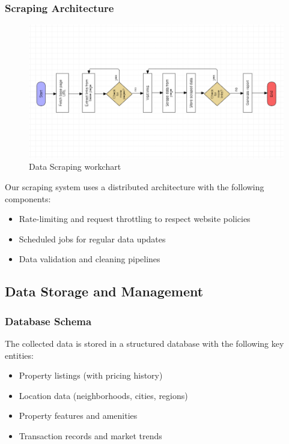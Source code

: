 \subsubsection{Scraping Architecture}
\begin{figure}[ht!]
    \centering
    \includegraphics[width=1\textwidth]{images/workchartscraper.png}
    \caption{Data Scraping workchart}
    \label{fig:scraping-workchart}
\end{figure}

Our scraping system uses a distributed architecture with the following components:
\begin{itemize}
    \item Rate-limiting and request throttling to respect website policies
    \item Scheduled jobs for regular data updates
    \item Data validation and cleaning pipelines
\end{itemize}

\subsection{Data Storage and Management}
\subsubsection{Database Schema}
The collected data is stored in a structured database with the following key entities:
\begin{itemize}
    \item Property listings (with pricing history)
    \item Location data (neighborhoods, cities, regions)
    \item Property features and amenities
    \item Transaction records and market trends
\end{itemize}

